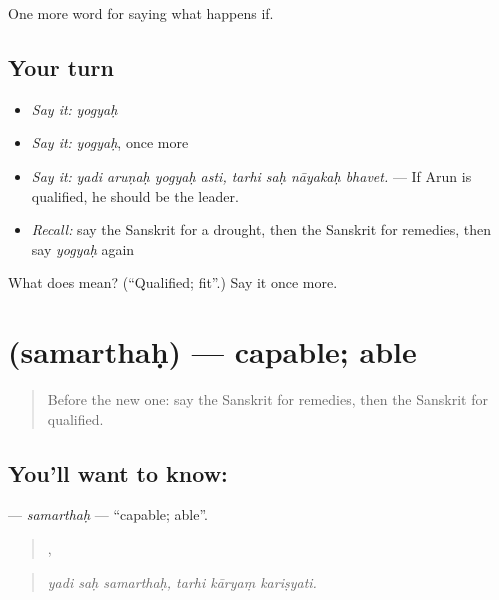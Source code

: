 \begin{grammarlens}[title={What you've built}]
One more word for saying what happens if.
\end{grammarlens}

\subsection*{Your turn}
\begin{itemize}
\raggedright
  \item \emph{Say it:} \emph{yogyaḥ}
  \item \emph{Say it:} \emph{yogyaḥ}, once more
  \item \emph{Say it:} \emph{yadi aruṇaḥ yogyaḥ asti, tarhi saḥ nāyakaḥ bhavet.} — If Arun is qualified, he should be the leader.
  \item \emph{Recall:} say the Sanskrit for a drought, then the Sanskrit for remedies, then say \emph{yogyaḥ} again
\end{itemize}

\begin{tcolorbox}[breakable,colback=teal!4,colframe=teal!35!black,title={Before you move on}]
What does  mean? (\textquotedblleft{}Qualified; fit\textquotedblright{}.) Say it once more.
\end{tcolorbox}
\section[\texorpdfstring{\sk{समर्थः} (samarthaḥ)}{समर्थः (samarthaḥ)}]{ (samarthaḥ) — capable; able}

\label{lesson:SA-C376-samarthah}



\begin{quote}
Before the new one: say the Sanskrit for remedies, then the Sanskrit for qualified.
\end{quote}

\subsection*{You'll want to know: }
\textbf{} — \emph{samarthaḥ} — \textquotedblleft{}capable; able\textquotedblright{}.

\begin{quote}
  ,   
\end{quote}

\begin{quote}
\emph{yadi saḥ samarthaḥ, tarhi kāryaṃ kariṣyati.}
\end{quote}

